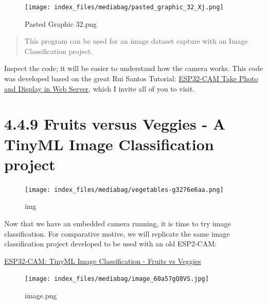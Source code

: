 \documentclass[
  letterpaper,
  DIV=11,
  numbers=noendperiod]{scrreprt}
\begin{document}
\begin{figure}[H]

{\centering \texttt{[image: index\_files/mediabag/pasted\_graphic\_32\_Xj.png]}

}

\caption{Pasted Graphic 32.png}

\end{figure}

\begin{quote}
This program can be used for an image dataset capture with an Image
Classification project.
\end{quote}

Inspect the code; it will be easier to understand how the camera works.
This code was developed based on the great Rui Santos Tutorial:
\href{https://randomnerdtutorials.com/esp32-cam-take-photo-display-web-server/}{ESP32-CAM
Take Photo and Display in Web Server}, which I invite all of you to
visit.

\hypertarget{fruits-versus-veggies---a-tinyml-image-classification-project}{%
\section*{4.4.9 Fruits versus Veggies - A TinyML Image Classification
project}\label{fruits-versus-veggies---a-tinyml-image-classification-project}}


\begin{figure}[H]

{\centering \texttt{[image: index\_files/mediabag/vegetables-g3276e6aa.png]}

}

\caption{img}

\end{figure}

Now that we have an embedded camera running, it is time to try image
classification. For comparative motive, we will replicate the same image
classification project developed to be used with an old ESP2-CAM:

\href{https://www.hackster.io/mjrobot/esp32-cam-tinyml-image-classification-fruits-vs-veggies-4ab970}{ESP32-CAM:
TinyML Image Classification - Fruits vs Veggies}

\begin{figure}[H]

{\centering \texttt{[image: index\_files/mediabag/image\_60a57gQ8VS.jpg]}

}

\caption{image.png}

\end{figure}
\end{document}
